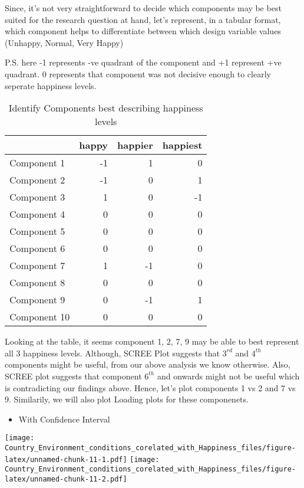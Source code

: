 \documentclass[]{book}
\providecommand{\tightlist}{%
  \setlength{\itemsep}{0pt}\setlength{\parskip}{0pt}}
\begin{document}
Since, it's not very straightforward to decide which components may be
best suited for the research question at hand, let's represent, in a
tabular format, which component helps to differentiate between which
design variable values (Unhappy, Normal, Very Happy)

P.S. here -1 represents -ve quadrant of the component and +1 represent
+ve quadrant. 0 represents that component was not decisive enough to
clearly seperate happiness levels.

\begin{table}

\caption{\label{tab:unnamed-chunk-10}Identify Components best describing happiness levels}
\centering
\begin{tabular}[t]{lrrr}
\toprule
  & happy & happier & happiest\\
\midrule
Component 1 & -1 & 1 & 0\\
Component 2 & -1 & 0 & 1\\
Component 3 & 1 & 0 & -1\\
Component 4 & 0 & 0 & 0\\
Component 5 & 0 & 0 & 0\\
\addlinespace
Component 6 & 0 & 0 & 0\\
Component 7 & 1 & -1 & 0\\
Component 8 & 0 & 0 & 0\\
Component 9 & 0 & -1 & 1\\
Component 10 & 0 & 0 & 0\\
\bottomrule
\end{tabular}
\end{table}

Looking at the table, it seems component 1, 2, 7, 9 may be able to best
represent all 3 happiness levels. Although, SCREE Plot suggests that
\(3^{rd}\) and \(4^{th}\) components might be useful, from our above
analysis we know otherwise. Also, SCREE plot suggests that component
\(6^{th}\) and onwards might not be useful which is contradicting our
findings above. Hence, let's plot components 1 vs 2 and 7 vs 9.
Similarily, we will also plot Loading plots for these componenets.

\begin{itemize}
\tightlist
\item
  With Confidence Interval
\end{itemize}

\texttt{[image: Country\_Environment\_conditions\_corelated\_with\_Happiness\_files/figure-latex/unnamed-chunk-11-1.pdf]}
\texttt{[image: Country\_Environment\_conditions\_corelated\_with\_Happiness\_files/figure-latex/unnamed-chunk-11-2.pdf]}
\end{document}
